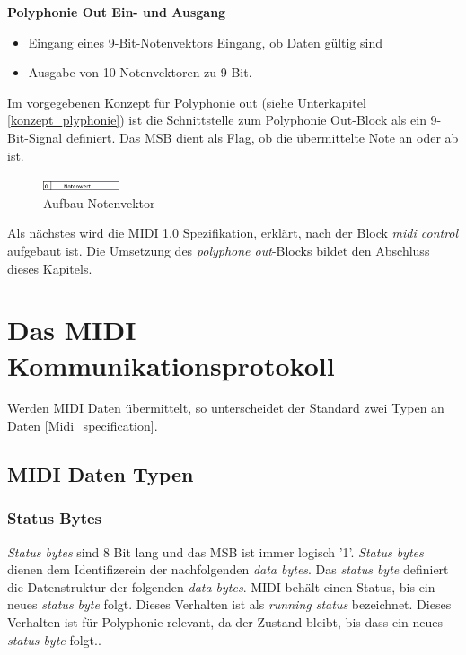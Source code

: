 \textbf{Polyphonie Out Ein- und Ausgang}
\begin{itemize}
	\item Eingang eines 9-Bit-Notenvektors \hspace*{22mm}Eingang, ob Daten gültig sind
	\item Ausgabe von 10 Notenvektoren zu 9-Bit.
\end{itemize}
\bigskip
Im vorgegebenen Konzept für Polyphonie out (siehe Unterkapitel \ref{konzept_plyphonie}) ist die Schnittstelle zum Polyphonie Out-Block als ein 9-Bit-Signal definiert. Das MSB dient als Flag, ob die übermittelte Note an oder ab ist.
\begin{figure}[H]
	\centering
	\includegraphics[width=0.2\textwidth]{images/midi_interface/NotenVektor.png}
	\caption{Aufbau Notenvektor}
	\label{fig.Notenvektor}
\end{figure}

Als nächstes wird die MIDI 1.0 Spezifikation, erklärt, nach der Block \textit{midi control} aufgebaut ist. Die Umsetzung des \textit{polyphone out}-Blocks bildet den Abschluss dieses Kapitels.\\


\newpage
\section{Das MIDI Kommunikationsprotokoll}\label{sect.midi_spezification}
Werden MIDI Daten übermittelt, so unterscheidet der Standard zwei Typen an Daten \ref{Midi_specification}.

\subsection{MIDI Daten Typen}\label{datenytpen}
\subsubsection*{Status Bytes}
\textit{Status bytes} sind 8 Bit lang und das MSB ist immer logisch '1'.  \textit{Status bytes} dienen dem Identifizerein der nachfolgenden \textit{data bytes}. Das \textit{status byte} definiert die Datenstruktur der folgenden \textit{data bytes}.
\newline
\newline
MIDI behält einen Status, bis ein neues \textit{status byte} folgt. Dieses Verhalten ist als \textit{running status} bezeichnet. Dieses Verhalten ist für Polyphonie relevant, da der Zustand bleibt, bis dass ein neues \textit{status byte} folgt..

